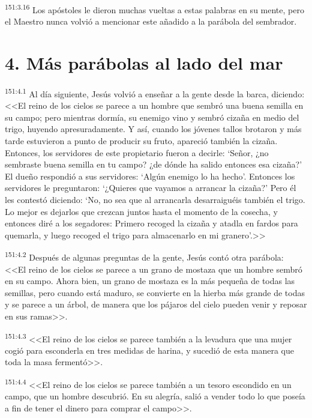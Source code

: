 \par 
\textsuperscript{151:3.16} Los apóstoles le dieron muchas vueltas a estas palabras en su mente, pero el Maestro nunca volvió a mencionar este añadido a la parábola del sembrador.

\section*{4. Más parábolas al lado del mar}
\par 
\textsuperscript{151:4.1} Al día siguiente, Jesús volvió a enseñar a la gente desde la barca, diciendo: <<El reino de los cielos se parece a un hombre que sembró una buena semilla en su campo; pero mientras dormía, su enemigo vino y sembró cizaña en medio del trigo, huyendo apresuradamente. Y así, cuando los jóvenes tallos brotaron y más tarde estuvieron a punto de producir su fruto, apareció también la cizaña. Entonces, los servidores de este propietario fueron a decirle: `Señor, ¿no sembraste buena semilla en tu campo? ¿de dónde ha salido entonces esa cizaña?' El dueño respondió a sus servidores: `Algún enemigo lo ha hecho'. Entonces los servidores le preguntaron: `¿Quieres que vayamos a arrancar la cizaña?' Pero él les contestó diciendo: `No, no sea que al arrancarla desarraiguéis también el trigo. Lo mejor es dejarlos que crezcan juntos hasta el momento de la cosecha, y entonces diré a los segadores: Primero recoged la cizaña y atadla en fardos para quemarla, y luego recoged el trigo para almacenarlo en mi granero'.>>

\par 
\textsuperscript{151:4.2} Después de algunas preguntas de la gente, Jesús contó otra parábola: <<El reino de los cielos se parece a un grano de mostaza que un hombre sembró en su campo. Ahora bien, un grano de mostaza es la más pequeña de todas las semillas, pero cuando está maduro, se convierte en la hierba más grande de todas y se parece a un árbol, de manera que los pájaros del cielo pueden venir y reposar en sus ramas>>.

\par 
\textsuperscript{151:4.3} <<El reino de los cielos se parece también a la levadura que una mujer cogió para esconderla en tres medidas de harina, y sucedió de esta manera que toda la masa fermentó>>.

\par 
\textsuperscript{151:4.4} <<El reino de los cielos se parece también a un tesoro escondido en un campo, que un hombre descubrió. En su alegría, salió a vender todo lo que poseía a fin de tener el dinero para comprar el campo>>.


